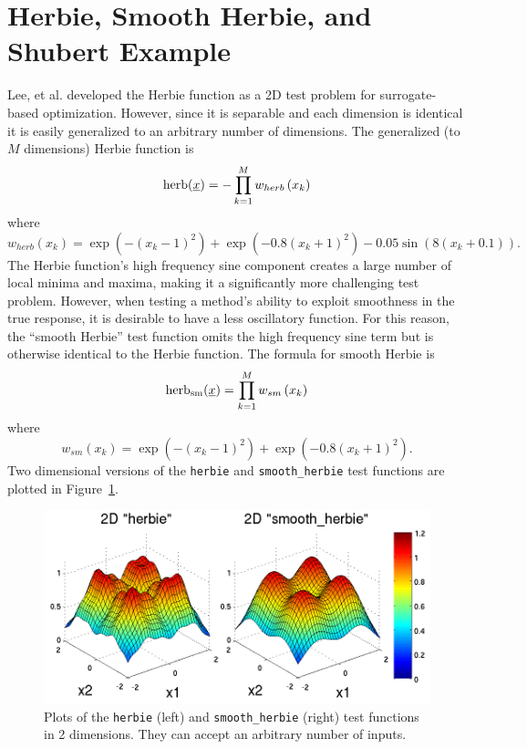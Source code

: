 \section{Herbie, Smooth Herbie, and Shubert Example}
Lee, et al. \cite{herbiefunc} developed the Herbie function as a 2D
test problem for surrogate-based optimization. However, since it is
separable and each dimension is identical it is easily generalized to
an arbitrary number of dimensions.  The generalized (to $M$
dimensions) Herbie function is
\begin{displaymath}
{\rm herb}(\underline{x})=-\prod_{k=1}^M w_{herb}\left(x_k\right)
\end{displaymath}
where 
\begin{displaymath}
w_{herb}\left(x_k\right)=\exp(-(x_k-1)^2)+\exp(-0.8(x_k+1)^2)-0.05\sin\left(8\left(x_k+0.1\right)\right).
\end{displaymath}
The Herbie function's high frequency sine component creates a large
number of local minima and maxima, making it a significantly more
challenging test problem.  However, when testing a method's ability to
exploit smoothness in the true response, it is desirable to have a
less oscillatory function.  For this reason, the ``smooth Herbie''
test function omits the high frequency sine term but is otherwise
identical to the Herbie function.  The formula for smooth Herbie is
\begin{displaymath}
{\rm herb_{sm}}(\underline{x})=\prod_{k=1}^M w_{sm}\left(x_k\right)
\end{displaymath}
where 
\begin{displaymath}
w_{sm}\left(x_k\right)=\exp(-(x_k-1)^2)+\exp(-0.8(x_k+1)^2).
\end{displaymath}
Two dimensional versions of the \texttt{herbie} and \texttt{smooth\_herbie} 
test functions are plotted in Figure~\ref{fig:2D_herbie__smooth_herbie}.
\begin{figure}
  \centering
  \centerline{\includegraphics[scale=1.0]{images/DAK5pt2_2D__herbie__smooth_herbie}}
  \caption{Plots of the \texttt{herbie} (left) and
           \texttt{smooth\_herbie} (right) test functions in 2
           dimensions.  They can accept an arbitrary number of
           inputs.}
  \label{fig:2D_herbie__smooth_herbie}
\end{figure}

